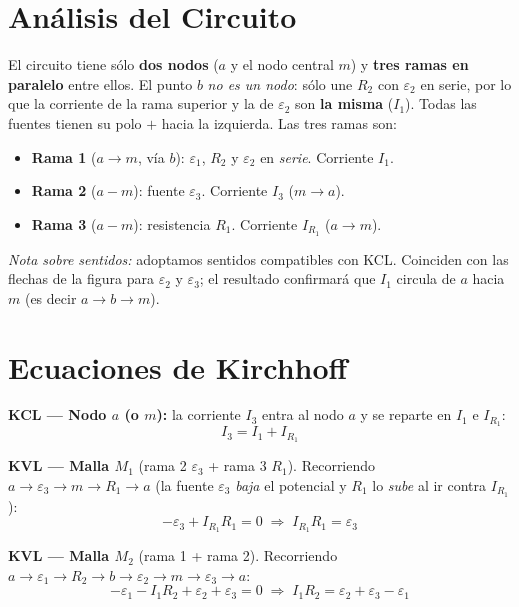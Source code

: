 \documentclass[12pt,letterpaper]{article}
\begin{document}
\section*{An\'alisis del Circuito}

El circuito tiene s\'olo \textbf{dos nodos} ($a$ y el nodo central $m$) y \textbf{tres ramas en
paralelo} entre ellos. El punto $b$ \emph{no es un nodo}: s\'olo une $R_2$ con $\varepsilon_2$ en
serie, por lo que la corriente de la rama superior y la de $\varepsilon_2$ son \textbf{la misma}
($I_1$). Todas las fuentes tienen su polo $+$ hacia la izquierda. Las tres ramas son:

\begin{itemize}\setlength\itemsep{1pt}
    \item \textbf{Rama 1} ($a\!\to\! m$, v\'ia $b$): $\varepsilon_1$, $R_2$ y $\varepsilon_2$ en
          \emph{serie}. Corriente $I_1$.
    \item \textbf{Rama 2} ($a\!-\!m$): fuente $\varepsilon_3$. Corriente $I_3$ ($m\!\to\! a$).
    \item \textbf{Rama 3} ($a\!-\!m$): resistencia $R_1$. Corriente $I_{R_1}$ ($a\!\to\! m$).
\end{itemize}

\noindent\small\textit{Nota sobre sentidos:} adoptamos sentidos compatibles con KCL. Coinciden con
las flechas de la figura para $\varepsilon_2$ y $\varepsilon_3$; el resultado confirmar\'a que $I_1$
circula de $a$ hacia $m$ (es decir $a\to b\to m$).\normalsize

\section*{Ecuaciones de Kirchhoff}

\textbf{KCL --- Nodo $a$ (o $m$):} la corriente $I_3$ entra al nodo $a$ y se reparte en $I_1$
e $I_{R_1}$:
\[
    \boxed{I_3 = I_1 + I_{R_1}} \tag{N}
\]

\medskip
\textbf{KVL --- Malla $M_1$} (rama 2 $\varepsilon_3$ + rama 3 $R_1$). Recorriendo
$a\to\varepsilon_3\to m\to R_1\to a$ (la fuente $\varepsilon_3$ \emph{baja} el potencial y $R_1$
lo \emph{sube} al ir contra $I_{R_1}$):
\[
    -\varepsilon_3 + I_{R_1}R_1 = 0
    \;\Rightarrow\;
    \boxed{I_{R_1}R_1 = \varepsilon_3} \tag{M1}
\]

\medskip
\textbf{KVL --- Malla $M_2$} (rama 1 + rama 2). Recorriendo
$a\to\varepsilon_1\to R_2\to b\to\varepsilon_2\to m\to\varepsilon_3\to a$:
\[
    -\varepsilon_1 - I_1 R_2 + \varepsilon_2 + \varepsilon_3 = 0
    \;\Rightarrow\;
    \boxed{I_1 R_2 = \varepsilon_2 + \varepsilon_3 - \varepsilon_1} \tag{M2}
\]
\end{document}
